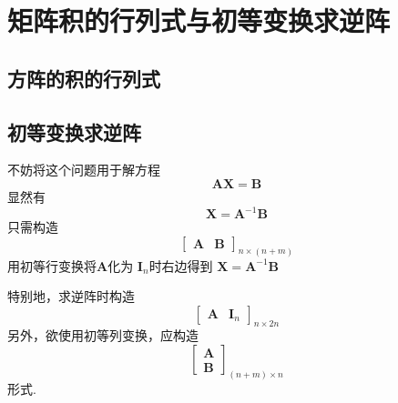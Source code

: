 \newpage
\section{矩阵积的行列式与初等变换求逆阵}
\subsection{方阵的积的行列式}
\subsection{初等变换求逆阵}
不妨将这个问题用于解方程
\[
    \bm{A}\bm{X} = \bm{B}
\]
显然有
\[
    \bm{X} = \bm{A}^{-1}\bm{B}
\]
只需构造
\[\begin{bmatrix}
        \bm{A} & \bm{B}
    \end{bmatrix}_{n \times \left(n+m\right)}
\]
用初等行变换将$\bm{A}$化为
$\bm{I}_n$时右边得到
$\bm{X} = \bm{A}^{-1}\bm{B}$

特别地，求逆阵时构造
\[
    \begin{bmatrix}
        \bm{A} & \bm{I}_n
    \end{bmatrix}_{n \times 2n}
\]
另外，欲使用初等列变换，应构造
\[
    \begin{bmatrix}
        \bm{A} \\
        \bm{B}
    \end{bmatrix}_{\left(n+m\right) \times n}
\]
形式.